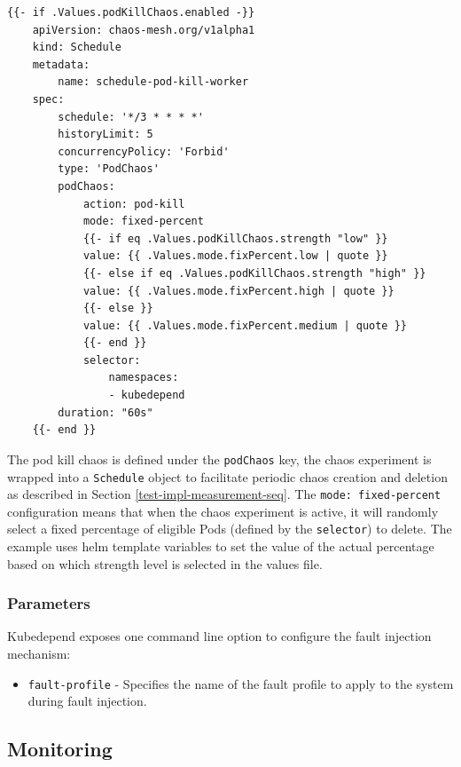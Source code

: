 \vspace{0.5cm}
\begin{minipage}{\linewidth}
	\begin{lstlisting}[caption={Pod Kill chaos}, label={lst:pod-kill-chaos}]
	{{- if .Values.podKillChaos.enabled -}}
	apiVersion: chaos-mesh.org/v1alpha1
	kind: Schedule
	metadata:
		name: schedule-pod-kill-worker
	spec:
		schedule: '*/3 * * * *'
		historyLimit: 5
		concurrencyPolicy: 'Forbid'
		type: 'PodChaos'
		podChaos:
			action: pod-kill
			mode: fixed-percent
			{{- if eq .Values.podKillChaos.strength "low" }}
			value: {{ .Values.mode.fixPercent.low | quote }}
			{{- else if eq .Values.podKillChaos.strength "high" }}
			value: {{ .Values.mode.fixPercent.high | quote }}
			{{- else }}
			value: {{ .Values.mode.fixPercent.medium | quote }}
			{{- end }}
			selector:
				namespaces:
				- kubedepend
		duration: "60s"
	{{- end }}\end{lstlisting}
\end{minipage}

The pod kill chaos is defined under the \texttt{podChaos} key, the chaos experiment is wrapped into a \texttt{Schedule} object to facilitate periodic chaos creation and deletion as described in Section \ref{test-impl-measurement-seq}. The \texttt{mode: fixed-percent} configuration means that when the chaos experiment is active, it will randomly select a fixed percentage of eligible Pods (defined by the \texttt{selector}) to delete. The example uses helm template variables to set the value of the actual percentage based on which strength level is selected in the values file.

\subsubsection{Parameters}

Kubedepend exposes one command line option to configure the fault injection mechanism:

\begin{itemize}
	\item \texttt{fault-profile} - Specifies the name of the fault profile to apply to the system during fault injection.
\end{itemize}

\subsection{Monitoring} \label{test-impl-monitoring}

